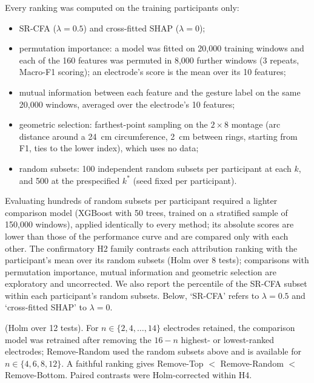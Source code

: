  Every ranking was computed on the training participants only:
\begin{itemize}
\item SR-CFA ($\lambda = 0.5$) and cross-fitted SHAP ($\lambda = 0$);
\item permutation importance: a model was fitted on 20,000 training windows and each of the 160 features was permuted in 8,000 further windows (3 repeats, Macro-F1 scoring); an electrode's score is the mean over its 10 features;
\item mutual information between each feature and the gesture label on the same 20,000 windows, averaged over the electrode's 10 features;
\item geometric selection: farthest-point sampling on the $2 \times 8$ montage (arc distance around a 24~cm circumference, 2~cm between rings, starting from F1, ties to the lower index), which uses no data;
\item random subsets: 100 independent random subsets per participant at each $k$, and 500 at the prespecified $k^*$ (seed fixed per participant).
\end{itemize}
Evaluating hundreds of random subsets per participant required a lighter comparison model (XGBoost with 50 trees, trained on a stratified sample of 150,000 windows), applied identically to every method; its absolute scores are lower than those of the performance curve and are compared only with each other. The confirmatory H2 family contrasts each attribution ranking with the participant's mean over its random subsets (Holm over 8 tests); comparisons with permutation importance, mutual information and geometric selection are exploratory and uncorrected. We also report the percentile of the SR-CFA subset within each participant's random subsets. Below, `SR-CFA' refers to $\lambda = 0.5$ and `cross-fitted SHAP' to $\lambda = 0$.

 (Holm over 12 tests).  For $n \in \{2, 4, \ldots, 14\}$ electrodes retained, the comparison model was retrained after removing the $16 - n$ highest- or lowest-ranked electrodes; Remove-Random used the random subsets above and is available for $n \in \{4, 6, 8, 12\}$. A faithful ranking gives Remove-Top $<$ Remove-Random $<$ Remove-Bottom. Paired contrasts were Holm-corrected within H4.

